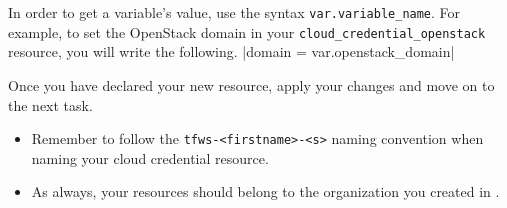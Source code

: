 \begin{tip}
In order to get a variable's value, use the syntax \texttt{var.variable\_name}.
For example, to set the OpenStack domain in your \texttt{cloud\_credential\_openstack} resource,
  you will write the following. |domain = var.openstack_domain|
\end{tip}

Once you have declared your new resource, apply your changes and move on to the next task.

\begin{warn}
  \begin{itemize}
    \item Remember to follow the \texttt{tfws-<firstname>-<s>} naming convention when naming your cloud credential resource.
    \item As always, your resources should belong to the organization you created in .
  \end{itemize}
\end{warn}

